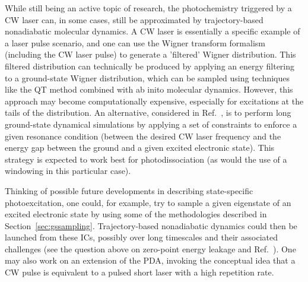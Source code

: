 \documentclass[9pt,bestpractices]{livecoms}
\begin{document}
\begin{itemize}
{While still being an active topic of research, the photochemistry triggered by a CW laser can, in some cases, still be approximated by trajectory-based nonadiabatic molecular dynamics.\cite{suchan2018importance} A CW laser is essentially a specific example of a laser pulse scenario, and one can use the Wigner transform formalism (including the CW laser pulse) to generate a 'filtered' Wigner distribution. This filtered distribution can technically be produced by applying an energy filtering to a ground-state Wigner distribution, which can be sampled using techniques like the QT method combined with ab inito molecular dynamics. However, this approach may become computationally expensive, especially for excitations at the tails of the distribution. An alternative, considered in Ref.~, is to perform long ground-state dynamical simulations by applying a set of constraints to enforce a given resonance condition (between the desired CW laser frequency and the energy gap between the ground and a given excited electronic state). This strategy is expected to work best for photodissociation (as would the use of a windowing in this particular case).

Thinking of possible future developments in describing state-specific photoexcitation, one could, for example, try to sample a given eigenstate of an excited electronic state by using some of the methodologies described in Section~\ref{sec:gssampling}. Trajectory-based nonadiabatic dynamics could then be launched from these ICs, possibly over long timescales and their associated challenges (see the question above on zero-point energy leakage and Ref.~). One may also work on an extension of the PDA, invoking the conceptual idea that a CW pulse is equivalent to a pulsed short laser with a high repetition rate.\cite{heller2018semiclassical}
}


\end{itemize}
\end{document}
